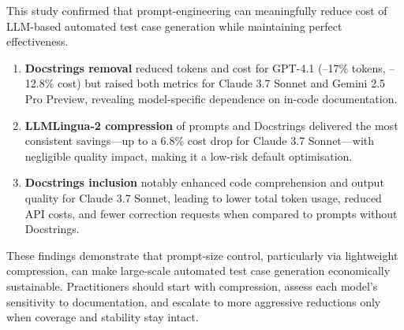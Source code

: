 This study confirmed that prompt-engineering can meaningfully reduce cost of LLM-based automated test case generation while maintaining perfect effectiveness.

\begin{enumerate}
    \item \textbf{Docstrings removal} reduced tokens and cost for GPT-4.1 (–17\% tokens, –12.8\% cost) but raised both metrics for Claude 3.7 Sonnet and Gemini 2.5 Pro Preview, revealing model-specific dependence on in-code documentation.
    \vspace{0.3cm}
    
    \item \textbf{LLMLingua-2 compression} of prompts and Docstrings delivered the most consistent savings—up to a 6.8\% cost drop for Claude 3.7 Sonnet—with negligible quality impact, making it a low-risk default optimisation.
    \vspace{0.3cm}
    
    \item \textbf{Docstrings inclusion} notably enhanced code comprehension and output quality for Claude 3.7 Sonnet, leading to lower total token usage, reduced API costs, and fewer correction requests when compared to prompts without Docstrings.
\end{enumerate}


These findings demonstrate that prompt-size control, particularly via lightweight compression, can make large-scale automated test case generation economically sustainable. Practitioners should start with compression, assess each model’s sensitivity to documentation, and escalate to more aggressive reductions only when coverage and stability stay intact.

